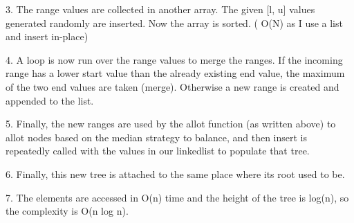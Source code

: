 \documentclass{article}
\begin{document}
3. The range values are collected in another array. The given [l, u] values generated randomly are inserted. Now the array is sorted. ( O(N) as I use a list and insert in-place)

4. A loop is now run over the range values to merge the ranges. If the incoming range has a lower start value than the already existing end value, the maximum of the two end values are taken (merge). Otherwise a new range is created and appended to the list.

5. Finally, the new ranges are used by the allot function (as written above) to allot nodes based on the median strategy to balance, and then insert is repeatedly called with the values in our linkedlist to populate that tree.

6. Finally, this new tree is attached to the same place where its root used to be.

7. The elements are accessed in O(n) time and the height of the tree is log(n), so the complexity is O(n log n).
\end{document}
